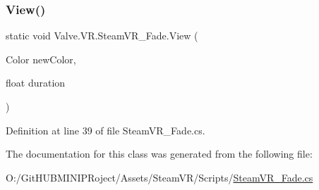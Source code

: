 \subsubsection{\texorpdfstring{View()}{View()}}
{\footnotesize\ttfamily static void Valve.\+V\+R.\+Steam\+V\+R\+\_\+\+Fade.\+View (\begin{DoxyParamCaption}\item[{Color}]{new\+Color,  }\item[{float}]{duration }\end{DoxyParamCaption})\hspace{0.3cm}{\ttfamily [static]}}



Definition at line 39 of file Steam\+V\+R\+\_\+\+Fade.\+cs.



The documentation for this class was generated from the following file\+:\begin{DoxyCompactItemize}
\item 
O\+:/\+Git\+H\+U\+B\+M\+I\+N\+I\+P\+Roject/\+Assets/\+Steam\+V\+R/\+Scripts/\mbox{\hyperlink{_steam_v_r___fade_8cs}{Steam\+V\+R\+\_\+\+Fade.\+cs}}\end{DoxyCompactItemize}
